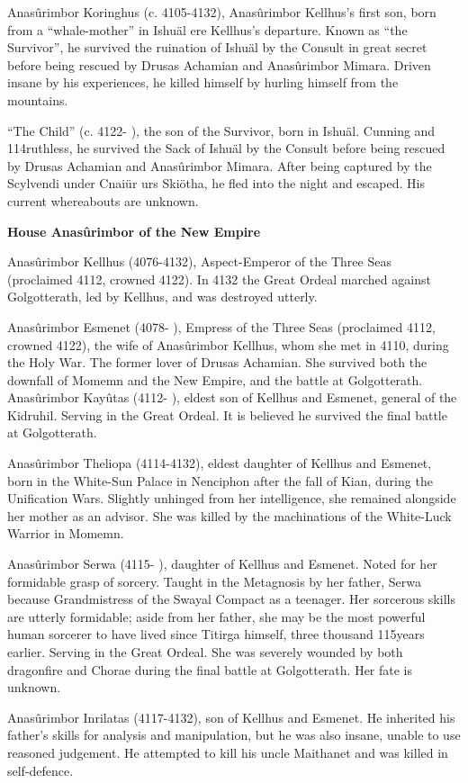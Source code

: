 \documentclass[]{book}
\begin{document}
Anasûrimbor Koringhus (c. 4105-4132), Anasûrimbor Kellhus's first son, born from a
``whale-mother'' in Ishuäl ere Kellhus's departure. Known as ``the Survivor'', he
survived the ruination of Ishuäl by the Consult in great secret before being
rescued by Drusas Achamian and Anasûrimbor Mimara. Driven insane by his
experiences, he killed himself by hurling himself from the mountains.

``The Child'' (c. 4122- ), the son of the Survivor, born in Ishuäl. Cunning and
114ruthless, he survived the Sack of Ishuäl by the Consult before being rescued by
Drusas Achamian and Anasûrimbor Mimara. After being captured by the
Scylvendi under Cnaiür urs Skiötha, he fled into the night and escaped. His
current whereabouts are unknown.

\textbf{House Anasûrimbor of the New Empire}

Anasûrimbor Kellhus (4076-4132), Aspect-Emperor of the Three Seas (proclaimed
4112, crowned 4122). In 4132 the Great Ordeal marched against Golgotterath,
led by Kellhus, and was destroyed utterly.

Anasûrimbor Esmenet (4078- ), Empress of the Three Seas (proclaimed 4112,
crowned 4122), the wife of Anasûrimbor Kellhus, whom she met in 4110,
during the Holy War. The former lover of Drusas Achamian. She survived both
the downfall of Momemn and the New Empire, and the battle at Golgotterath.
Anasûrimbor Kayûtas (4112- ), eldest son of Kellhus and Esmenet, general of the
Kidruhil. Serving in the Great Ordeal. It is believed he survived the final battle
at Golgotterath.

Anasûrimbor Theliopa (4114-4132), eldest daughter of Kellhus and Esmenet, born
in the White-Sun Palace in Nenciphon after the fall of Kian, during the
Unification Wars. Slightly unhinged from her intelligence, she remained
alongside her mother as an advisor. She was killed by the machinations of the
White-Luck Warrior in Momemn.

Anasûrimbor Serwa (4115- ), daughter of Kellhus and Esmenet. Noted for her
formidable grasp of sorcery. Taught in the Metagnosis by her father, Serwa
because Grandmistress of the Swayal Compact as a teenager. Her sorcerous
skills are utterly formidable; aside from her father, she may be the most
powerful human sorcerer to have lived since Titirga himself, three thousand
115years earlier. Serving in the Great Ordeal. She was severely wounded by both
dragonfire and Chorae during the final battle at Golgotterath. Her fate is
unknown.

Anasûrimbor Inrilatas (4117-4132), son of Kellhus and Esmenet. He inherited his
father's skills for analysis and manipulation, but he was also insane, unable to
use reasoned judgement. He attempted to kill his uncle Maithanet and was
killed in self-defence.
\end{document}
